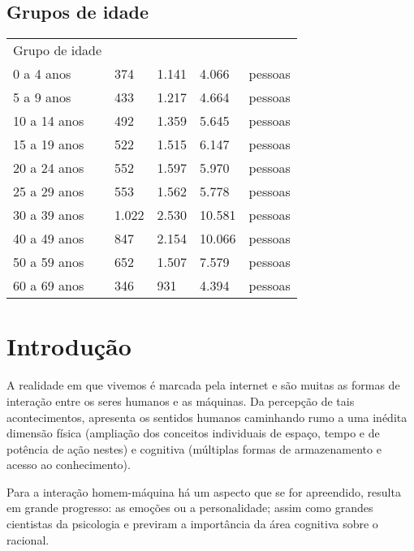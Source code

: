 \documentclass[
	12pt,				    %
	openright,			    %
	oneside,			    %
	a4paper,			    %
    sumario=tradicional,    %
	english,			    %
	brazil,				    %
	]{abntex2}              %
\begin{document}
\section{Grupos de idade}
\begin{table}[]
\begin{tabular}{lllll}
Grupo de idade &       &       &        &         \\
0 a 4 anos     & 374   & 1.141 & 4.066  & pessoas \\
5 a 9 anos     & 433   & 1.217 & 4.664  & pessoas \\
10 a 14 anos   & 492   & 1.359 & 5.645  & pessoas \\
15 a 19 anos   & 522   & 1.515 & 6.147  & pessoas \\
20 a 24 anos   & 552   & 1.597 & 5.970  & pessoas \\
25 a 29 anos   & 553   & 1.562 & 5.778  & pessoas \\
30 a 39 anos   & 1.022 & 2.530 & 10.581 & pessoas \\
40 a 49 anos   & 847   & 2.154 & 10.066 & pessoas \\
50 a 59 anos   & 652   & 1.507 & 7.579  & pessoas \\
60 a 69 anos   & 346   & 931   & 4.394  & pessoas
\end{tabular}
\end{table}

\chapter{Introdução}\label{sec:introducao}

A realidade em que vivemos é marcada pela internet e são muitas as formas de interação entre os seres humanos e as máquinas. Da percepção de tais acontecimentos,   apresenta os sentidos humanos caminhando rumo a uma inédita dimensão física (ampliação dos conceitos individuais de espaço, tempo e de potência de ação nestes) e cognitiva (múltiplas formas de armazenamento e acesso ao conhecimento).

Para a interação homem-máquina há um aspecto que se for apreendido, resulta em grande progresso: as emoções ou a personalidade; assim como grandes cientistas da psicologia \cite{damasio2012erro,goleman1995inteligencia}  e \cite{dalgleish2000handbook,lane2002cognitive}  previram a importância da área cognitiva sobre o racional.
\end{document}
